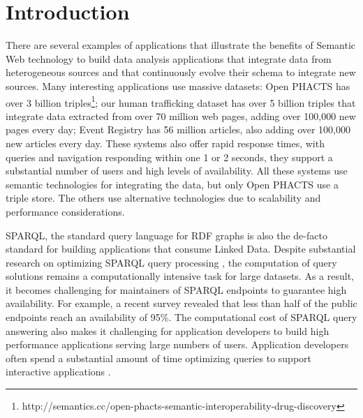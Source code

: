 \section{Introduction}
There are several examples of applications that illustrate the benefits of Semantic Web technology to build data analysis applications that integrate data from heterogeneous sources and that continuously evolve their schema to integrate new sources.
Many interesting applications use massive datasets: 
Open PHACTS \cite{Groth_Loizou_Gray_Goble_Harland_Pettifer_2014} has over 3 billion triples\footnote{http://semantics.cc/open-phacts-semantic-interoperability-drug-discovery};
our human trafficking dataset has over 5 billion triples that integrate data extracted from over 70 million web pages, adding over 100,000 new pages every day;
Event Registry has 56 million articles, also adding over 100,000 new articles every day.
These systems also offer rapid response times, with queries and navigation responding within one 1 or 2 seconds, they support a substantial number of users and high levels of availability.
All these systems use semantic technologies for integrating the data, but only Open PHACTS use a triple store.
The others use alternative technologies due to scalability and performance considerations.

SPARQL, the standard query language for RDF graphs is also the de-facto standard for building applications that consume Linked Data. 
Despite substantial research on optimizing SPARQL query processing \cite{Pham2013}, the computation of query solutions remains a computationally intensive task for large datasets.
As a result, it becomes challenging for maintainers of SPARQL endpoints to guarantee high availability.
For example, a recent survey \cite{buil2013sparql} revealed that less than half of the public endpoints reach an availability of 95\%.
The computational cost of SPARQL query answering also makes it challenging for application developers to build high performance applications serving large numbers of users.
Application developers often spend a substantial amount of time optimizing queries to support interactive applications \cite{Loizou_Angles_Groth_2014}.

